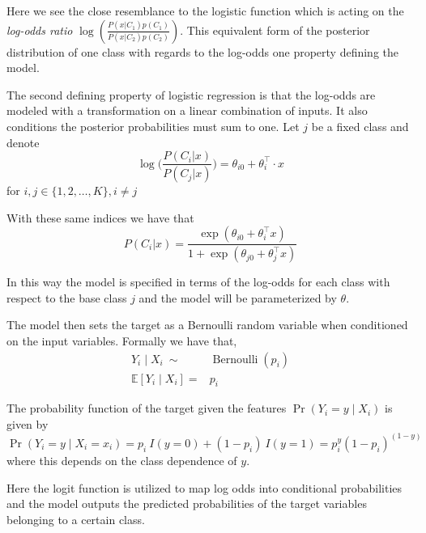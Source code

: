 Here we see the close resemblance to the logistic function which is acting on the \textit{log-odds ratio} $ \log(  \frac{ P(x|C_1)p(C_1)}{P(x|C_2)p(C_2) })$. This equivalent form of the posterior distribution of one class with regards to the log-odds one property defining the model.



The second defining property of logistic regression is that the log-odds are modeled with a transformation on a linear combination of inputs. It also conditions the posterior probabilities must sum to one. Let $j$ be a fixed class and denote
\begin{equation}\label{logit-logOddss}
 \log\big( \frac{P(C_i|x)}{P(C_j|x)}\big) = \theta_{i0} + \theta_i^\intercal \cdot x
 \end{equation}  
for $i,j \in \{1,2,\ldots,K\}, i\neq j$

With these same indices we have that
\begin{equation} P(C_i|x) = \frac{\exp(\theta_{i0} + \theta_i^\intercal x)}{1 + \exp(\theta_{j0} + \theta_j^\intercal x)}
\end{equation}

In this way the model is specified in terms of the log-odds for each class with respect to the base class $j$ and the model will be parameterized by $\theta$.

The model then sets the target as a Bernoulli random variable when conditioned on the input variables. Formally we have that,
\begin{equation}
\begin{split}
Y_i \mid X_i \ \sim & \operatorname{Bernoulli}(p_i) \\
\mathbb{E}[Y_i \mid X_i ] = & p_i
\end{split}
\end{equation}


The probability function of the target given the features $\Pr(Y_i=y\mid X_i)$ is given by
\begin{equation}\label{logit-probabilityDensity}
\Pr(Y_i=y \mid X_i = x_i) = p_i \ I(y=0) + (1-p_i) \ I(y=1) = p_i^{y} {(1-p_i)}^{(1-y)}
\end{equation}
where this depends on the class dependence of $y$.

Here the logit function is utilized to map log odds into conditional probabilities and the model outputs the predicted probabilities of the target variables belonging to a certain class.

